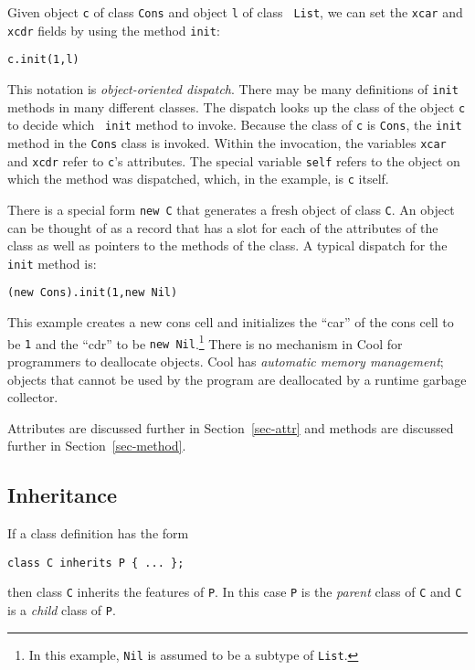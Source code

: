 \documentclass[11pt]{article}
\begin{document}
Given object {\tt c} of class {\tt Cons} and object {\tt l} of class {\tt
List}, we can set the {\tt xcar} and {\tt xcdr} fields by using the
method {\tt init}:

\begin{verbatim}
c.init(1,l)
\end{verbatim}

This notation is {\em object-oriented dispatch}.  There may be many
definitions of {\tt init} methods in many different classes.  The
dispatch looks up the class of the object {\tt c} to decide which {\tt
init} method to invoke.  Because the class of {\tt c} is {\tt Cons},
the {\tt init} method in the {\tt Cons} class is invoked.  Within the
invocation, the variables {\tt xcar} and {\tt xcdr} refer to {\tt c}'s
attributes.  The special variable {\tt self} refers to the object on
which the method was dispatched, which, in the example, is {\tt c} itself.

There is a special form {\tt new C} that generates a fresh object of
class {\tt C}.  An object can be thought of as a record that has a
slot for each of the attributes of the class as well as
pointers to the methods of the class.
A typical dispatch for the {\tt init} method is:
\begin{verbatim}
(new Cons).init(1,new Nil)
\end{verbatim}
This example creates a new cons cell and initializes the ``car'' of
the cons cell to be {\tt 1} and the ``cdr'' to be {\tt new
Nil}.\footnote{In this example, {\tt Nil} is assumed to be a subtype
of {\tt List}.} There is no mechanism in Cool for programmers to
deallocate objects.  Cool has {\em automatic memory management};
objects that cannot be used by the program are deallocated by a
runtime garbage collector.


Attributes are discussed further in Section~\ref{sec-attr}
and methods are discussed further in Section~\ref{sec-method}.


\subsection{Inheritance}
\label{sec-inherit}

If a class definition has the form
\begin{verbatim}
class C inherits P { ... };
\end{verbatim}
then class {\tt C} inherits the features of {\tt P}.
In this case {\tt P} is the {\em parent} class of {\tt C}
and {\tt C} is a {\em child} class of {\tt P}.
\end{document}
